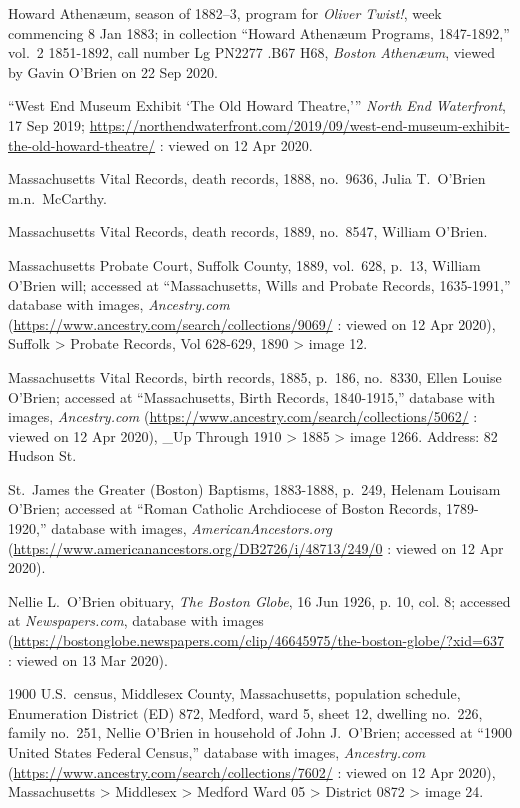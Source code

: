 \begin{thebibliography}{999}
Howard Athen\ae um, season of 1882--3, program for \textit{Oliver Twist!}, week commencing 8 Jan 1883; in collection ``Howard Athen\ae um Programs, 1847-1892,'' vol.\ 2 1851-1892, call number Lg PN2277 .B67 H68, \textit{Boston Athen\ae um}, viewed by Gavin O'Brien on 22 Sep 2020.

``West End Museum Exhibit `The Old Howard Theatre,''' \textit{North End Waterfront}, 17 Sep 2019;  \url{https://northendwaterfront.com/2019/09/west-end-museum-exhibit-the-old-howard-theatre/} : viewed on 12 Apr 2020.

Massachusetts Vital Records, death records, 1888, no.\ 9636, Julia T.\ O'Brien m.n.\ McCarthy.

Massachusetts Vital Records, death records, 1889, no.\ 8547, William O'Brien.

Massachusetts Probate Court, Suffolk County, 1889, vol.\ 628, p.\ 13, William O'Brien will; accessed at ``Massachusetts, Wills and Probate Records, 1635-1991,'' database with images, \textit{Ancestry.com} (\url{https://www.ancestry.com/search/collections/9069/} : viewed on 12 Apr 2020), Suffolk > Probate Records, Vol 628-629, 1890 > image 12.

Massachusetts Vital Records, birth records, 1885, p.\ 186, no.\ 8330, Ellen Louise O'Brien; accessed at ``Massachusetts, Birth Records, 1840-1915,'' database with images, \textit{Ancestry.com} (\url{https://www.ancestry.com/search/collections/5062/} : viewed on 12 Apr 2020), \_Up Through 1910 > 1885 > image 1266. Address: 82 Hudson St.

St.\ James the Greater (Boston) Baptisms, 1883-1888, p.\ 249, Helenam Louisam O'Brien; accessed at ``Roman Catholic Archdiocese of Boston Records, 1789-1920,'' database with images, \textit{AmericanAncestors.org} (\url{https://www.americanancestors.org/DB2726/i/48713/249/0} : viewed on 12 Apr 2020).

Nellie L.\ O’Brien obituary, \textit{The Boston Globe}, 16 Jun 1926, p. 10, col. 8; accessed at \textit{Newspapers.com}, database with images (\url{https://bostonglobe.newspapers.com/clip/46645975/the-boston-globe/?xid=637} : viewed on 13 Mar 2020). 

1900 U.S.\ census, Middlesex County, Massachusetts, population schedule, Enumeration District (ED) 872, Medford, ward 5, sheet 12, dwelling no.\ 226, family no.\ 251, Nellie O'Brien in household of John J.\ O'Brien; accessed at ``1900 United States Federal Census,'' database with images, \textit{Ancestry.com} (\url{https://www.ancestry.com/search/collections/7602/} : viewed on 12 Apr 2020), Massachusetts > Middlesex > Medford Ward 05 > District 0872 > image 24.


\end{thebibliography}
